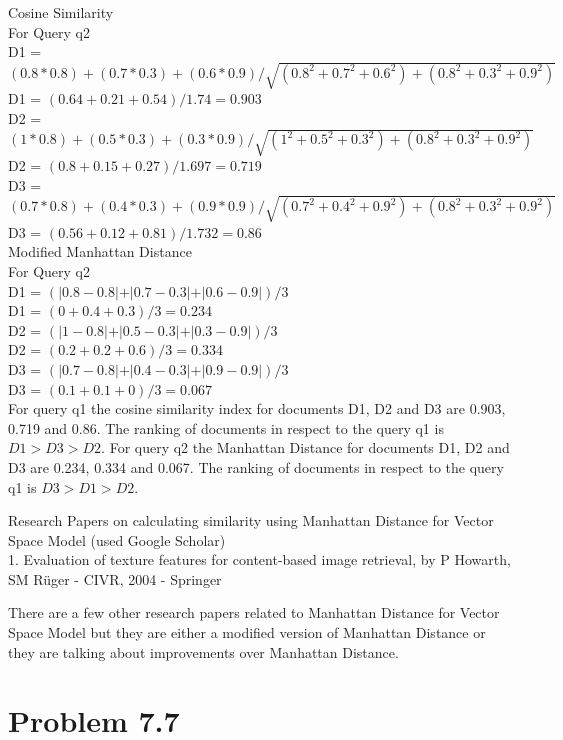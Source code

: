 \documentclass[12pt]{report}
\begin{document}
Cosine Similarity\\
For Query q2 \\
D1 = $(0.8*0.8 )+ (0.7*0.3) + (0.6*0.9)/ \sqrt{(0.8^2 + 0.7^2 + 0.6^2) + (0.8^2 + 0.3^2 + 0.9^2)}$\\
D1 = $ (0.64 + 0.21 + 0.54)/1.74  = 0.903$\\
D2 = $(1*0.8 )+ (0.5*0.3) + (0.3*0.9)/ \sqrt{(1^2 + 0.5^2 + 0.3^2) + (0.8^2 + 0.3^2 + 0.9^2)}$\\
D2 = $ (0.8 + 0.15 + 0.27)/1.697  = 0.719$\\ 
D3 = $(0.7*0.8 )+ (0.4*0.3) + (0.9*0.9)/ \sqrt{(0.7^2 + 0.4^2 + 0.9^2) + (0.8^2 + 0.3^2 + 0.9^2)}$\\
D3 = $ (0.56 + 0.12 + 0.81)/1.732  = 0.86$\\ 
Modified Manhattan Distance\\
For Query q2\\
D1 = $(\lvert 0.8 - 0.8 \lvert + \lvert 0.7 - 0.3\lvert + \lvert 0.6- 0.9\lvert) /3 $\\
D1 = $ (0 + 0.4 + 0.3)/3 = 0.234$\\ 
D2 = $(\lvert 1 - 0.8 \lvert + \lvert 0.5 - 0.3\lvert + \lvert 0.3- 0.9\lvert)/3 $\\
D2 = $( 0.2 + 0.2 + 0.6)/3 = 0.334$\\
D3 = $(\lvert 0.7 - 0.8 \lvert + \lvert 0.4 - 0.3\lvert + \lvert 0.9- 0.9\lvert)/3 $\\
D3 = $ (0.1 + 0.1 + 0)/3= 0.067$ \\

For query q1 the cosine similarity index for documents D1, D2 and D3 are 0.903, 0.719 and 0.86. The ranking of documents in respect to the query q1 is $D1 > D3 > D2$. For query q2 the Manhattan Distance for documents D1, D2 and D3 are 0.234, 0.334 and 0.067. The ranking of documents in respect to the query q1 is $D3 > D1> D2$.

Research Papers on calculating similarity using Manhattan Distance for Vector Space Model (used Google Scholar)\\
1. Evaluation of texture features for content-based image retrieval, by P Howarth, SM Rüger - CIVR, 2004 - Springer

There are a few other research papers related to Manhattan Distance for Vector Space Model but they are either a modified version of Manhattan Distance or they are talking about improvements over Manhattan Distance.

\chapter{Problem 7.7}
\end{document}
